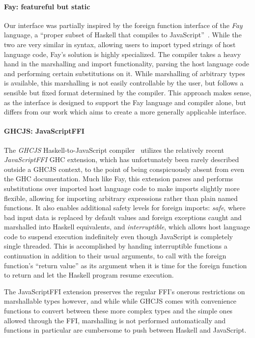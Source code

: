 \documentclass{sigplanconf}
\begin{document}
\paragraph{Fay: featureful but static}
Our interface was partially inspired by the foreign function interface of the
\emph{Fay} language,
a ``proper subset of Haskell that compiles to JavaScript''\ \cite{fay}.
While the two are very similar in syntax, allowing users to import typed
strings of host language code, Fay's solution is highly specialized.
The compiler takes a heavy hand in the marshalling and import functionality,
parsing the host language code and performing certain substitutions on it.
While marshalling of arbitrary types is available, this marshalling is not
easily controllable by the user, but follows a sensible but fixed format
determined by the compiler.
This approach makes sense, as the interface is designed to support the Fay
language and compiler alone, but differs from our work which aims to create
a more generally applicable interface.

\paragraph{GHCJS: JavaScriptFFI}
The \emph{GHCJS} Haskell-to-JavaScript compiler\ \cite{ghcjs} utilizes the
relatively recent \emph{JavaScriptFFI} GHC extension,
which has unfortunately been rarely described outside a GHCJS context, to the
point of being conspicuously absent from even the GHC documentation.
Much like Fay, this extension parses and
performs substitutions over imported host language code to make imports
slightly more flexible, allowing for importing arbitrary expressions rather
than plain named functions.
It also enables additional safety levels for foreign
imports: \emph{safe}, where bad input data is replaced by default values and
foreign exceptions caught and marshalled into Haskell equivalents,
and \emph{interruptible}, which allows host language code to suspend execution
indefinitely even though JavaScript is completely single threaded.
This is accomplished by handing interruptible functions a continuation in
addition to their usual arguments, to call with the foreign function's
``return value'' as its argument when it is time for the foreign function
to return and let the Haskell program resume execution.

The JavaScriptFFI extension preserves the regular FFI's onerous restrictions
on marshallable types however, and while while GHCJS comes with convenience
functions to convert between these more complex types and the simple ones
allowed through the FFI, marshalling is not performed automatically and
functions in particular are cumbersome to push between Haskell and JavaScript.
\end{document}
